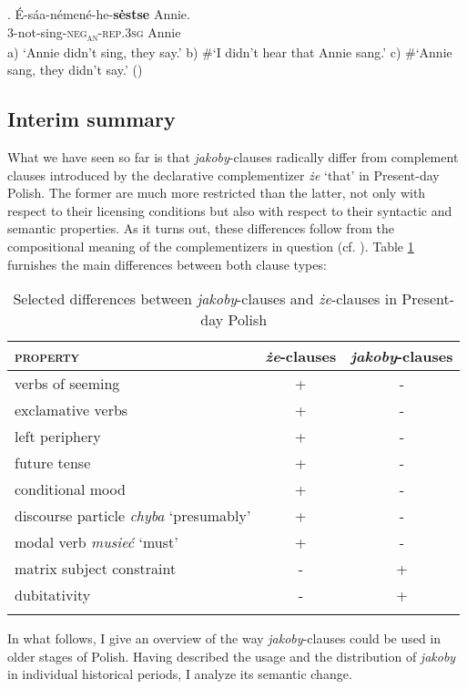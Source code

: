 \documentclass[output=paper
,modfonts
,nonflat]{langsci/langscibook}
\newcommand{\glossformat}[1]{\textsc{#1}}
\newcommand{\thirdperson}{\glossformat{3}\xspace}
\newcommand{\an}{\glossformat{an}\xspace}
\newcommand{\negation}{\glossformat{neg}\xspace}
\newcommand{\rep}{\glossformat{rep}\xspace}
\newcommand{\sg}{\glossformat{sg}\xspace}
\newcommand{\nquelle}[1]{\newline\phantom{x}\hfill(#1)}
\begin{document}
\exg.	 	É-sáa-némené-he-\textbf{sėstse} Annie. \label{cheyenne} \\
		{\thirdperson}-not-sing-{\negation}\textsubscript{{\an}}-{\rep}.{\thirdperson}{\sg}  Annie \\
		a) `Annie didn't sing, they say.' \newline
		b)  \#`I didn't hear that Annie sang.' \newline
		c)  \#`Annie sang, they didn't say.' \nquelle{\citealt[29, ex. 2.56b]{Murray2017}}
		
\subsection{Interim summary}

What we have seen so far is that \emph{jakoby}-clauses radically differ from complement clauses introduced by the declarative complementizer \emph{że} `that' in Present-day Polish. The former are much more restricted than the latter, not only with respect to their licensing conditions but also with respect to their syntactic and semantic properties. As it turns out, these differences follow from the compositional meaning of the complementizers in question (cf. \cite{Moulton2009}). Table \ref{differences} furnishes the main differences between both clause types: 

\begin{table}[h] \center
\begin{tabular}{lcc} 
\lsptoprule
 \textsc{property} & \emph{że}-clauses & \emph{jakoby}-clauses \\
\midrule
verbs of seeming & + & - \\
exclamative verbs & + & - \\
left periphery & + & - \\
future tense & + & - \\
conditional mood & + & - \\
discourse particle \emph{chyba} `presumably' & + & - \\
modal verb \emph{musieć} `must' & + & - \\
matrix subject constraint & - & + \\
dubitativity & - & + \\  
\lspbottomrule
\end{tabular}
\caption{Selected differences between \emph{jakoby}-clauses and \emph{że}-clauses in Present-day Polish} \label{differences}
\end{table}

\noindent In what follows, I give an overview of the way \emph{jakoby}-clauses could be used in older stages of Polish. Having described the usage and the distribution of \emph{jakoby} in individual historical periods, I analyze its semantic change.  
\end{document}
